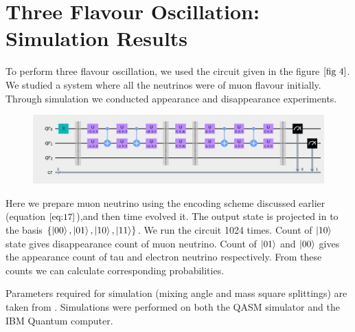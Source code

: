 \documentclass[12pt,a4paper]{report}
\begin{document}
\section{Three Flavour Oscillation: Simulation Results}
To perform three flavour oscillation, we used the circuit given in the figure $\ref{fig 4}$. We studied a system where all the neutrinos were of muon flavour initially. Through simulation we conducted appearance and disappearance experiments.
\begin{figure}[H]
\graphicspath{ {./Images/} }
\centering	
{\includegraphics[width=\textwidth]{fig_7.png}}
\end{figure}\par
Here we prepare muon neutrino using the encoding scheme discussed earlier (equation $\ref{eq:17}$),and then time evolved it. The output state is projected in to the basis $\{\ket{00},\ket{01},\ket{10},\ket{11}\}$. We run the circuit 1024 times.  Count of $\ket{10}$ state gives disappearance count of muon neutrino. Count of $\ket{01}$ and $\ket{00}$ gives the appearance count of tau and electron neutrino respectively. From these counts we can calculate corresponding probabilities.

Parameters required for simulation (mixing angle and mass square splittings) are taken from \cite{estaban}.  Simulations were performed on both the QASM simulator and the IBM Quantum computer.
\end{document}
